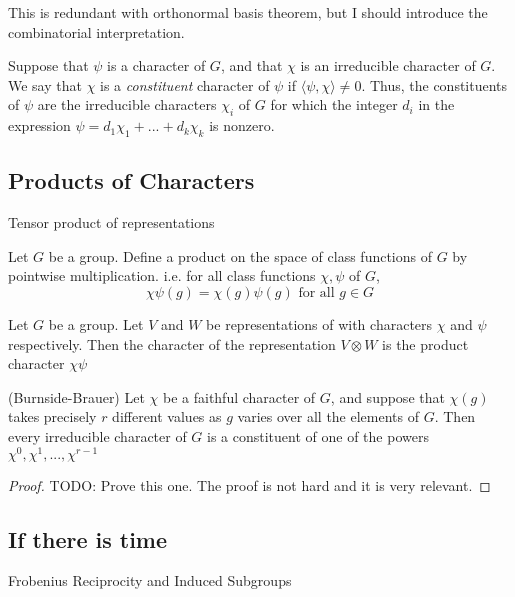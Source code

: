 This is redundant with orthonormal basis theorem, but I should introduce the combinatorial interpretation.

\begin{definition}
    Suppose that $\psi$ is a character of $G$, and that $\chi$ is an irreducible character of $G$. We say that 
    $\chi$ is a \emph{constituent} character of $\psi$ if $\langle \psi, \chi \rangle \neq 0$. Thus, the 
    constituents of $\psi$ are the irreducible characters $\chi_i$ of $G$ for which the integer $d_i$ in the 
    expression $\psi = d_1\chi_1 + ... + d_k\chi_k$ is nonzero.
\end{definition}





\subsection{Products of Characters}

\begin{definition}
    Tensor product of representations
\end{definition}

\begin{definition}
    Let $G$ be a group. Define a product on the space of class functions of $G$ by pointwise multiplication. i.e.
    for all class functions $\chi, \psi$ of $G$, 
    \[
        \chi\psi(g) = \chi(g)\psi(g) \text{ for all } g \in G
    \]
\end{definition}


\begin{proposition}
    Let $G$ be a group. Let $V$ and $W$ be representations of with characters $\chi$ and $\psi$ respectively. Then 
    the character of the representation $V \otimes W$ is the product character $\chi\psi$
\end{proposition}


\begin{theorem}\label{thm:Burnside_Brauer}(Burnside-Brauer)
    Let $\chi$ be a faithful character of $G$, and suppose that $\chi(g)$ takes precisely $r$ different values as 
    $g$ varies over all the elements of $G$. Then every irreducible character of $G$ is a constituent of one of the 
    powers $\chi^0, \chi^1, ... , \chi^{r-1}$
\end{theorem}

\begin{proof}
    TODO: Prove this one. The proof is not hard and it is very relevant.
\end{proof}




\subsection{If there is time}


Frobenius Reciprocity and Induced Subgroups
